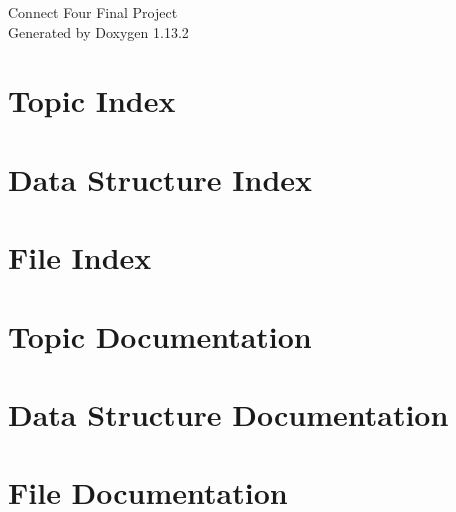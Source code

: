 \documentclass[twoside]{book}
\newcommand{\+}{\discretionary{\mbox{\scriptsize$\hookleftarrow$}}{}{}}
\newcommand{\clearemptydoublepage}{%
    \newpage{\pagestyle{empty}\cleardoublepage}%
  }
\begin{document}
  \raggedbottom
    \hypersetup{pageanchor=false,
                bookmarksnumbered=true,
                pdfencoding=unicode
               }
  \begin{titlepage}
  \vspace*{7cm}
  \begin{center}%
  {\Large Connect Four Final Project}\\
  \vspace*{1cm}
  {\large Generated by Doxygen 1.13.2}\\
  \end{center}
  \end{titlepage}
  \clearemptydoublepage
  \tableofcontents
  \clearemptydoublepage
  \hypersetup{pageanchor=true}
\chapter{Topic Index}

\chapter{Data Structure Index}

\chapter{File Index}

\chapter{Topic Documentation}





\chapter{Data Structure Documentation}


\chapter{File Documentation}






















  \backmatter
  \newpage
  \clearemptydoublepage
  \printindex
\end{document}
